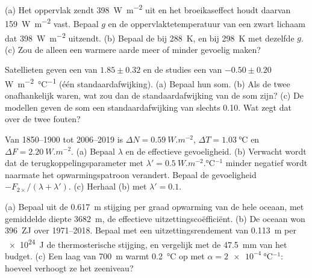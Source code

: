\begin{exercise}[$\star\star$]\label{exo:b2:anthropogenic-climate-change:5}
(a) Het oppervlak zendt \qty{398}{W.m^{-2}} uit en het broeikaseffect houdt daarvan \qty{159}{W.m^{-2}}
vast. Bepaal $g$ en de oppervlaktetemperatuur van een zwart lichaam dat \qty{398}{W.m^{-2}} uitzendt. (b) Bepaal de
 bij \qty{288}{K}, en bij \qty{298}{K} met dezelfde $g$. (c) Zou de 
alleen een warmere aarde meer of minder gevoelig maken?
\end{exercise}

\begin{exercise}[$\star\star$]\label{exo:b2:anthropogenic-climate-change:6}
Satellieten geven een  van $1.85 \pm 0.32$ en de studies een  van
$-0.50 \pm 0.20$ \unit{W.m^{-2}.\celsius^{-1}} (één standaardafwijking). (a) Bepaal hun som.
(b) Als de twee onafhankelijk waren, wat zou dan de standaardafwijking van de som zijn? (c) De modellen
geven de som een standaardafwijking van slechts \num{0.10}. Wat zegt dat over de twee fouten?
\end{exercise}

\begin{exercise}[$\star\star$]\label{exo:b2:anthropogenic-climate-change:7}
Van 1850--1900 tot 2006--2019 is $\Delta N = \qty{0.59}{W.m^{-2}}$, $\Delta T = \qty{1.03}{\celsius}$
en $\Delta F = \qty{2.20}{W.m^{-2}}$. (a) Bepaal $\lambda$ en de effectieve gevoeligheid. (b) Verwacht wordt dat de
terugkoppelingsparameter met $\lambda' = \qty{0.5}{W.m^{-2}.\celsius^{-1}}$ minder negatief wordt
naarmate het opwarmingspatroon verandert. Bepaal de gevoeligheid $-F_{2\times}/(\lambda + \lambda')$.
(c) Herhaal (b) met $\lambda' = 0.1$.
\end{exercise}

\begin{exercise}[$\star\star$]\label{exo:b2:anthropogenic-climate-change:8}
(a) Bepaal uit de \qty{0.617}{m} stijging per graad opwarming van de hele oceaan, met gemiddelde diepte
\qty{3682}{m}, de effectieve uitzettingscoëfficiënt. (b) De oceaan won \qty{396}{ZJ} over
1971--2018. Bepaal met een uitzettingsrendement van \qty{0.113}{m} per \qty{e24}{J} de thermosterische
stijging, en vergelijk met de \qty{47.5}{mm} van het budget. (c) Een laag van \qty{700}{m} warmt
\qty{0.2}{\celsius} op met $\alpha = \qty{2e-4}{\celsius^{-1}}$: hoeveel verhoogt ze het zeeniveau?
\end{exercise}

